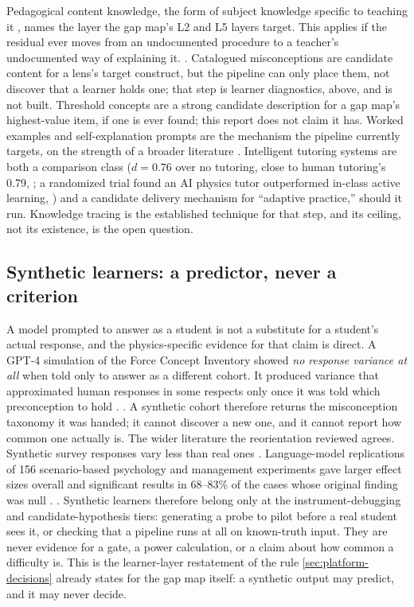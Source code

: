 Pedagogical content knowledge, the form of subject knowledge specific to teaching it
\parencite{shulman1986those,shulman1987knowledge}, names the layer the gap map's L2 and L5 layers
target. This applies if the residual ever moves from an undocumented procedure to a teacher's
undocumented way of explaining it. \evint. Catalogued misconceptions
\parencite{smith1994misconceptions,disessa1993toward,vosniadou1992framework} are candidate content
for a lens's target construct, but the pipeline can only place them, not discover that a learner
holds one; that step is learner diagnostics, above, and is not built. Threshold concepts
\parencite{meyer2003threshold,meyer2005threshold} are a strong candidate description for a gap
map's highest-value item, if one is ever found; this report does not claim it has. Worked examples
and self-explanation prompts are the mechanism the pipeline currently targets, on the strength of a
broader literature \parencite{barbieri2023metaanalysis,sweller1988cognitive}. Intelligent tutoring
systems are both a comparison class ($d = 0.76$ over no tutoring, close to human tutoring's 0.79,
\parencite{vanlehn2011relative}; a randomized trial found an AI physics tutor outperformed in-class
active learning, \parencite{kestin2025aitutoring}) and a candidate delivery mechanism for
``adaptive practice,'' should it run. Knowledge tracing is the established technique for that step,
and its ceiling, not its existence, is the open question.

\subsection{Synthetic learners: a predictor, never a criterion}
\label{sec:education-synthetic}

A model prompted to answer as a student is not a substitute for a student's actual response, and
the physics-specific evidence for that claim is direct. A GPT-4 simulation of the Force Concept
Inventory showed \emph{no response variance at all} when told only to answer as a different
cohort. It produced variance that approximated human responses in some respects only once it was
told which preconception to hold \parencite{kieser2023chatgpt}. \evlit. A synthetic cohort therefore returns the misconception
taxonomy it was handed; it cannot discover a new one, and it cannot report how common one actually
is. The wider literature the reorientation reviewed agrees. Synthetic survey responses vary less than
real ones \parencite{bisbee2024synthetic}. Language-model replications of 156 scenario-based
psychology and management experiments gave larger effect sizes overall and significant results in
68--83\% of the cases whose original finding was null \parencite{cui2025large}. \evlit. Synthetic learners therefore belong only
at the instrument-debugging and candidate-hypothesis tiers: generating a probe to pilot before a
real student sees it, or checking that a pipeline runs at all on known-truth input. They are never
evidence for a gate, a power calculation, or a claim about how common a difficulty is. This is the
learner-layer restatement of the rule \cref{sec:platform-decisions} already states for the gap map
itself: a synthetic output may predict, and it may never decide.


